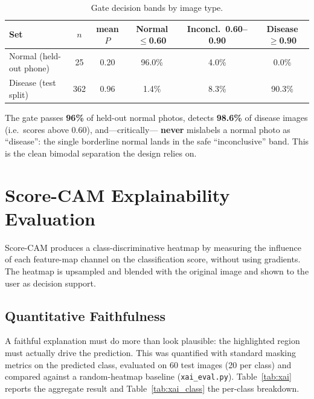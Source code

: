 \begin{table}[H]
\centering
\caption{Gate decision bands by image type.}
\label{tab:gate}
\begin{tabular}{|l|c|c|c|c|c|}
\hline
\textbf{Set} & \textbf{$n$} & \textbf{mean $P$} & \textbf{Normal $\le$0.60} & \textbf{Inconcl.\ 0.60--0.90} & \textbf{Disease $\ge$0.90} \\ \hline
Normal (held-out phone) & 25  & 0.20 & 96.0\% & 4.0\% & 0.0\% \\ \hline
Disease (test split)    & 362 & 0.96 & 1.4\%  & 8.3\% & 90.3\% \\ \hline
\end{tabular}
\end{table}

\noindent The gate passes \textbf{96\%} of held-out normal photos, detects
\textbf{98.6\%} of disease images (i.e.\ scores above 0.60), and—critically—
\textbf{never} mislabels a normal photo as ``disease'': the single borderline
normal lands in the safe ``inconclusive'' band. This is the clean bimodal
separation the design relies on.

\section{Score-CAM Explainability Evaluation}

Score-CAM produces a class-discriminative heatmap by measuring the influence of
each feature-map channel on the classification score, without using gradients.
The heatmap is upsampled and blended with the original image and shown to the
user as decision support.

\subsection{Quantitative Faithfulness}

A faithful explanation must do more than look plausible: the highlighted region
must actually drive the prediction. This was quantified with standard masking
metrics on the predicted class, evaluated on 60 test images (20 per class) and
compared against a random-heatmap baseline (\texttt{xai\_eval.py}).
Table~\ref{tab:xai} reports the aggregate result and
Table~\ref{tab:xai_class} the per-class breakdown.

